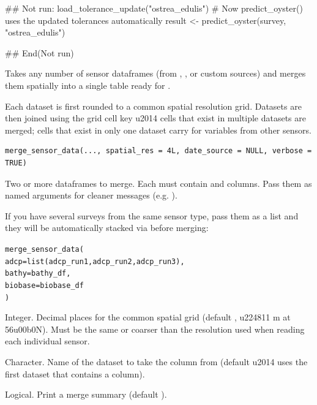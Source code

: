 \documentclass[a4paper]{book}
\begin{document}
%
\begin{Examples}
\begin{ExampleCode}
## Not run: 
load_tolerance_update("ostrea_edulis")
# Now predict_oyster() uses the updated tolerances automatically
result <- predict_oyster(survey, "ostrea_edulis")

## End(Not run)
\end{ExampleCode}
\end{Examples}
%
\begin{Description}
Takes any number of sensor dataframes (from ,
, or custom sources) and merges them spatially into a
single table ready for .

Each dataset is first rounded to a common spatial resolution grid. Datasets
are then joined using the grid cell key \bsl{}u2014 cells that exist in multiple
datasets are merged; cells that exist in only one dataset carry  for
variables from other sensors.
\end{Description}
%
\begin{Usage}
\begin{verbatim}
merge_sensor_data(..., spatial_res = 4L, date_source = NULL, verbose = TRUE)
\end{verbatim}
\end{Usage}
%
\begin{Arguments}
\begin{ldescription}
\item[\code{...}] Two or more dataframes to merge. Each must contain  and 
columns. Pass them as named arguments for cleaner messages (e.g.
).

 If you have several surveys from the
same sensor type, pass them as a list and they will be automatically
stacked via  before merging:

\begin{alltt}merge_sensor_data(
  adcp    = list(adcp_run1, adcp_run2, adcp_run3),
  bathy   = bathy_df,
  biobase = biobase_df
)
\end{alltt}


\item[\code{spatial\_res}] Integer. Decimal places for the common spatial grid
(default , \bsl{}u224811 m at 56\bsl{}u00b0N). Must be the same or coarser than the
resolution used when reading each individual sensor.

\item[\code{date\_source}] Character. Name of the dataset to take the  column
from (default  \bsl{}u2014 uses the first dataset that contains a 
column).

\item[\code{verbose}] Logical. Print a merge summary (default ).
\end{ldescription}
\end{Arguments}
\end{document}
